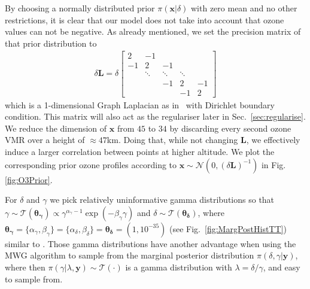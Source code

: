By choosing a normally distributed prior $\pi(\bm{x}|\delta)$ with zero mean and no other restrictions, it is clear that our model does not take into account that ozone values can not be negative.
As already mentioned, we set the precision matrix of that prior distribution to
\begin{align}
	\delta \bm{L} =
	\delta
	\begin{bmatrix}
		2 & -1 & & &  \\
		-1 & 2 & -1 & &   \\
		& \ddots & \ddots & \ddots &\\ 
		& & -1 & 2 & -1  \\
		& & & -1 & 2 
	\end{bmatrix} 
	\label{eq:GLapl} 
\end{align}
which is a 1-dimensional Graph Laplacian as in~\cite{wang2015graphs,fox2016fast} with Dirichlet boundary condition.
This matrix will also act as the regulariser later in Sec.~\ref{sec:regularise}.
We reduce the dimension of $\bm{x}$ from $45$ to $34$ by discarding every second ozone VMR over a height of $\approx47$km.
Doing that, while not changing $\bm{L}$, we effectively induce a larger correlation between points at higher altitude.
We plot the corresponding prior ozone profiles according to $\bm{x}\sim \mathcal{N}(0, (\delta \bm{L})^{-1})$ in Fig. \ref{fig:O3Prior}.

For $\delta$ and $\gamma$ we pick relatively uninformative gamma distributions so that $\gamma \sim \mathcal{T}(\bm{\theta_{\gamma}}) \propto \gamma^{\alpha_\gamma -1 } \exp{( -\beta_\gamma \gamma) } $ and $\delta \sim \mathcal{T}(\bm{\theta_{\delta}})$, where $\bm{\theta_{\gamma}} = \{  \alpha_\gamma, \beta_\gamma\}  = \{ \alpha_\delta ,\beta_\delta\} = \bm{\theta_{\delta}} = (1,10^{-35})$ (see Fig.~\ref{fig:MargPostHistTT}) similar to \cite{fox2016fast}.
Those gamma distributions have another advantage when using the MWG algorithm to sample from the marginal posterior distribution $\pi(\delta, \gamma | \bm{y})$, where then $\pi(\gamma | \lambda, \bm{y}) \sim \mathcal{T}(\cdot)$ is a gamma distribution with $\lambda = \delta / \gamma $, and easy to sample from.

